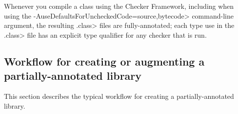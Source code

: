 \begin{sloppypar}
Whenever you compile a class using the Checker Framework, including when
using the \<-AuseDefaultsForUncheckedCode=source,bytecode> command-line
argument, the resulting \<.class> files are fully-annotated; each type use
in the \<.class> file has an explicit type qualifier for any checker that
is run.
\end{sloppypar}


\subsection{Workflow for creating or augmenting a partially-annotated library\label{compiling-libraries-workflow}}

This section describes the typical workflow for creating a
partially-annotated library.

